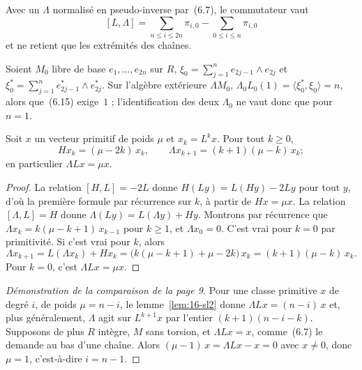 \begin{enonce}
Avec un $\Lambda$ normalisé en pseudo-inverse par~(6.7), le commutateur vaut
\[
[L, \Lambda] = \sum_{n \leqslant i \leqslant 2n} \pi_{i,0} - \sum_{0 \leqslant i \leqslant n} \pi_{i,0}
\]
et ne retient que les extrémités des chaînes.
\end{enonce}

\begin{enonce}
Soient $M_0$ libre de base $e_1, \dots, e_{2n}$ sur $R$, $\xi_0 = \sum_{j=1}^{n} e_{2j-1} \wedge e_{2j}$ et $\xi_0^* = \sum_{j=1}^{n} e^*_{2j-1} \wedge e^*_{2j}$. Sur l'algèbre extérieure $\Lambda M_0$, $\Lambda_0 L_0(1) = \langle \xi_0^*, \xi_0 \rangle = n$, alors que~(6.15) exige~$1$ ; l'identification des deux $\Lambda_0$ ne vaut donc que pour $n = 1$.
\end{enonce}

\begin{lemme}\label{lem:16-sl2}
Soit $x$ un vecteur primitif de poids $\mu$ et $x_k = L^k x$. Pour tout $k \geqslant 0$,
\[
H x_k = (\mu - 2k)\, x_k, \qquad \Lambda x_{k+1} = (k+1)(\mu - k)\, x_k ;
\]
en particulier $\Lambda L x = \mu x$.
\end{lemme}

\begin{proof}
La relation $[H, L] = -2L$ donne $H(Ly) = L(Hy) - 2Ly$ pour tout $y$, d'où la première formule par récurrence sur $k$, à partir de $Hx = \mu x$. La relation $[\Lambda, L] = H$ donne $\Lambda(Ly) = L(\Lambda y) + Hy$. Montrons par récurrence que $\Lambda x_k = k(\mu - k + 1)\, x_{k-1}$ pour $k \geqslant 1$, et $\Lambda x_0 = 0$. C'est vrai pour $k = 0$ par primitivité. Si c'est vrai pour $k$, alors
\[
\Lambda x_{k+1} = L(\Lambda x_k) + H x_k = \bigl(k(\mu - k + 1) + \mu - 2k\bigr)\, x_k = (k+1)(\mu - k)\, x_k .
\]
Pour $k = 0$, c'est $\Lambda L x = \mu x$.
\end{proof}

\begin{proof}[Démonstration de la comparaison de la page 9]
Pour une classe primitive $x$ de degré $i$, de poids $\mu = n - i$, le lemme~\ref{lem:16-sl2} donne $\Lambda L x = (n - i)\,x$ et, plus généralement, $\Lambda$ agit sur $L^{k+1} x$ par l'entier $(k+1)(n - i - k)$. Supposons de plus $R$ intègre, $M$ sans torsion, et $\Lambda L x = x$, comme~(6.7) le demande au bas d'une chaîne. Alors $(\mu - 1)\,x = \Lambda L x - x = 0$ avec $x \neq 0$, donc $\mu = 1$, c'est-à-dire $i = n - 1$.
\end{proof}

